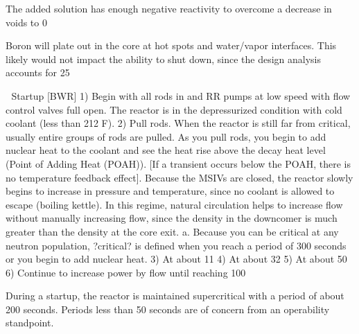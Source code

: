 \documentclass[10pt]{article}
\begin{document}
The added solution has enough negative reactivity to overcome a decrease in voids to 0%

Boron will plate out in the core at hot spots and water/vapor interfaces. This likely would not impact the ability to shut down, since the design analysis accounts for 25%


Startup [BWR]
1)	Begin with all rods in and RR pumps at low speed with flow control valves full open. The reactor is in the depressurized condition with cold coolant (less than 212 F). 
2)	Pull rods. When the reactor is still far from critical, usually entire groups of rods are pulled. As you pull rods, you begin to add nuclear heat to the coolant and see the heat rise above the decay heat level (Point of Adding Heat (POAH)). [If a transient occurs below the POAH, there is no temperature feedback effect]. Because the MSIVs are closed, the reactor slowly begins to increase in pressure and temperature, since no coolant is allowed to escape (boiling kettle). In this regime, natural circulation helps to increase flow without manually increasing flow, since the density in the downcomer is much greater than the density at the core exit. 
a.	Because you can be critical at any neutron population, ?critical? is defined when you reach a period of 300 seconds or you begin to add nuclear heat. 
3)	At about 11%
4)	At about 32%
5)	At about 50%
6)	Continue to increase power by flow until reaching 100%

During a startup, the reactor is maintained supercritical with a period of about 200 seconds. Periods less than 50 seconds are of concern from an operability standpoint. 
\end{document}
